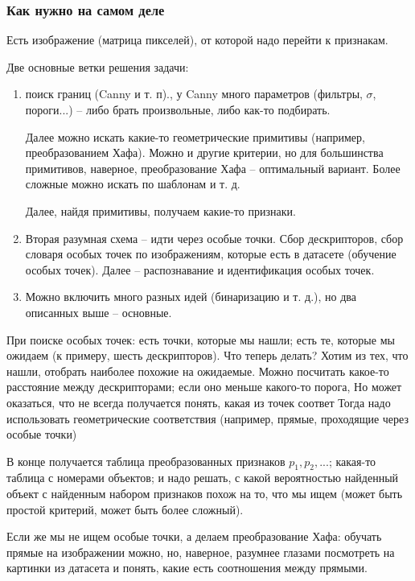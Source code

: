 \documentclass[main.tex]{subfiles}
\begin{document}
\subsubsection{Как нужно на самом деле}

Есть изображение (матрица пикселей), от которой надо перейти к признакам.

Две основные ветки решения задачи: 

\begin{enumerate}
	\item поиск границ (Canny и т. п)., у Canny много параметров (фильтры, $\sigma$, пороги...) -- либо брать произвольные, либо как-то подбирать.
	
	Далее можно искать какие-то геометрические примитивы (например, преобразованием Хафа).
	Можно и другие критерии, но для большинства примитивов, наверное, преобразование Хафа -- оптимальный вариант.
	Более сложные можно искать по шаблонам и т. д.
	
	Далее, найдя примитивы, получаем какие-то признаки.
	\item Вторая разумная схема -- идти через особые точки.
	Сбор дескрипторов, сбор словаря особых точек по изображениям, которые есть в датасете (обучение особых точек).
	Далее -- распознавание и идентификация особых точек.
	
	\item Можно включить много разных идей (бинаризацию и т. д.), но два описанных выше -- основные.
\end{enumerate}

При поиске особых точек: есть точки, которые мы нашли; есть те, которые мы ожидаем (к примеру, шесть дескрипторов).
Что теперь делать? Хотим из тех, что нашли, отобрать наиболее похожие на ожидаемые.
Можно посчитать какое-то расстояние между дескрипторами; если оно меньше какого-то порога, 
Но может оказаться, что не всегда получается понять, какая из точек соответ
Тогда надо использовать геометрические соответствия (например, прямые, проходящие через особые точки)

В конце получается таблица преобразованных признаков $ p_1, p_2, ... $; какая-то таблица с номерами объектов; и надо решать, с какой вероятностью найденный объект с найденным набором признаков похож на то, что мы ищем (может быть простой критерий, может быть более сложный).

Если же мы не ищем особые точки, а делаем преобразование Хафа: обучать прямые на изображении можно, но, наверное, разумнее глазами посмотреть на картинки из датасета и понять, какие есть соотношения между прямыми.
\end{document}
